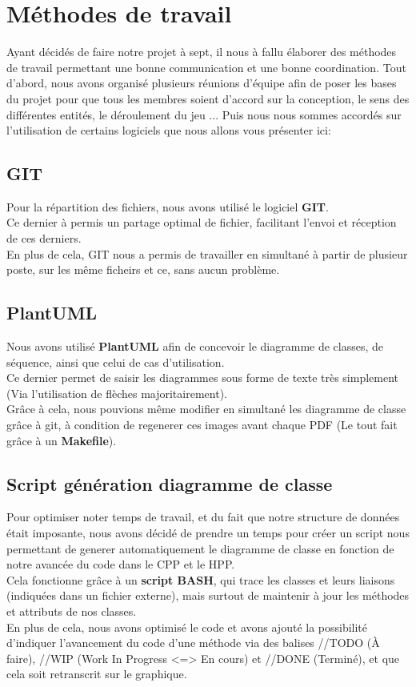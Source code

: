 \chapter{Méthodes de travail}
    Ayant décidés de faire notre projet à sept, il nous à fallu élaborer des méthodes de travail permettant une bonne communication et une bonne coordination. Tout d'abord, nous avons organisé plusieurs réunions d'équipe afin de poser les bases du projet pour que tous les membres soient d'accord sur la conception, le sens des différentes entités, le déroulement du jeu ... Puis nous nous sommes accordés sur l'utilisation de certains logiciels que nous allons vous présenter ici:\\
    \section{GIT}
        Pour la répartition des fichiers, nous avons utilisé le logiciel \textbf{GIT}.\\
        Ce dernier à permis un partage optimal de fichier, facilitant l'envoi et réception de ces derniers.\\
        En plus de cela, GIT nous a permis de travailler en simultané à partir de plusieur poste, sur les même ficheirs et ce, sans aucun problème.\\
    \section{PlantUML}
        Nous avons utilisé \textbf{PlantUML} afin de concevoir le diagramme de classes, de séquence, ainsi que celui de cas d'utilisation.\\
        Ce dernier permet de saisir les diagrammes sous forme de texte très simplement (Via l'utilisation de flèches majoritairement). \\
        Grâce à cela, nous pouvions même modifier en simultané les diagramme de classe grâce à git, à condition de regenerer ces images avant chaque PDF (Le tout fait grâce à un \textbf{Makefile}).\\
    \section{Script génération diagramme de classe}
        Pour optimiser noter temps de travail, et du fait que notre structure de données était imposante, nous avons décidé de prendre un temps pour créer un script nous permettant de generer automatiquement le diagramme de classe en fonction de notre avancée du code dans le CPP et le HPP.\\
        Cela fonctionne grâce à un \textbf{script BASH}, qui trace les classes et leurs liaisons (indiquées dans un fichier externe), mais surtout de maintenir à jour les méthodes et attributs de nos classes. \\
        En plus de cela, nous avons optimisé le code et avons ajouté la possibilité d'indiquer l'avancement du code d'une méthode via des balises //TODO (À faire), //WIP (Work In Progress <=> En cours) et //DONE (Terminé), et que cela soit retranscrit sur le graphique.
